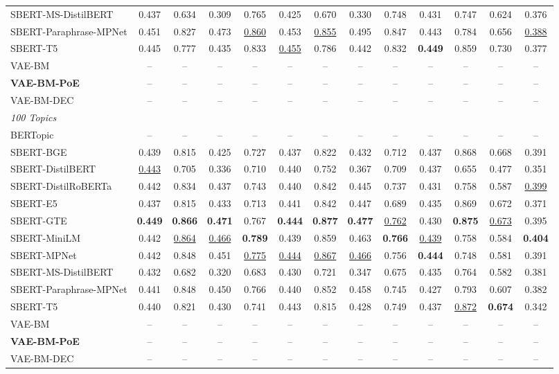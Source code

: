 \begin{table}[t]
{\begin{tabular}{lcccccccccccc}
SBERT-MS-DistilBERT & 0.437 & 0.634 & 0.309 & 0.765 & 0.425 & 0.670 & 0.330 & 0.748 & 0.431 & 0.747 & 0.624 & 0.376 \\
SBERT-Paraphrase-MPNet & 0.451 & 0.827 & 0.473 & \underline{0.860} & 0.453 & \underline{0.855} & 0.495 & 0.847 & 0.443 & 0.784 & 0.656 & \underline{0.388} \\
SBERT-T5 & 0.445 & 0.777 & 0.435 & 0.833 & \underline{0.455} & 0.786 & 0.442 & 0.832 & \textbf{0.449} & 0.859 & 0.730 & 0.377 \\
\midrule
VAE-BM & -- & -- & -- & -- & -- & -- & -- & -- & -- & -- & -- & -- \\
\textbf{VAE-BM-PoE} & -- & -- & -- & -- & -- & -- & -- & -- & -- & -- & -- & -- \\
VAE-BM-DEC & -- & -- & -- & -- & -- & -- & -- & -- & -- & -- & -- & -- \\
\midrule
\multicolumn{13}{l}{\textit{100 Topics}} \\
BERTopic & -- & -- & -- & -- & -- & -- & -- & -- & -- & -- & -- & -- \\
SBERT-BGE & 0.439 & 0.815 & 0.425 & 0.727 & 0.437 & 0.822 & 0.432 & 0.712 & 0.437 & 0.868 & 0.668 & 0.391 \\
SBERT-DistilBERT & \underline{0.443} & 0.705 & 0.336 & 0.710 & 0.440 & 0.752 & 0.367 & 0.709 & 0.437 & 0.655 & 0.477 & 0.351 \\
SBERT-DistilRoBERTa & 0.442 & 0.834 & 0.437 & 0.743 & 0.440 & 0.842 & 0.445 & 0.737 & 0.431 & 0.758 & 0.587 & \underline{0.399} \\
SBERT-E5 & 0.437 & 0.815 & 0.433 & 0.713 & 0.441 & 0.842 & 0.447 & 0.689 & 0.435 & 0.869 & 0.672 & 0.371 \\
SBERT-GTE & \textbf{0.449} & \textbf{0.866} & \textbf{0.471} & 0.767 & \textbf{0.444} & \textbf{0.877} & \textbf{0.477} & \underline{0.762} & 0.430 & \textbf{0.875} & \underline{0.673} & 0.395 \\
SBERT-MiniLM & 0.442 & \underline{0.864} & \underline{0.466} & \textbf{0.789} & 0.439 & 0.859 & 0.463 & \textbf{0.766} & \underline{0.439} & 0.758 & 0.584 & \textbf{0.404} \\
SBERT-MPNet & 0.442 & 0.848 & 0.451 & \underline{0.775} & \underline{0.444} & \underline{0.867} & \underline{0.466} & 0.756 & \textbf{0.444} & 0.748 & 0.581 & 0.391 \\
SBERT-MS-DistilBERT & 0.432 & 0.682 & 0.320 & 0.683 & 0.430 & 0.721 & 0.347 & 0.675 & 0.435 & 0.764 & 0.582 & 0.381 \\
SBERT-Paraphrase-MPNet & 0.441 & 0.848 & 0.450 & 0.766 & 0.440 & 0.852 & 0.458 & 0.745 & 0.427 & 0.793 & 0.607 & 0.382 \\
SBERT-T5 & 0.440 & 0.821 & 0.430 & 0.741 & 0.443 & 0.815 & 0.428 & 0.749 & 0.437 & \underline{0.872} & \textbf{0.674} & 0.342 \\
\midrule
VAE-BM & -- & -- & -- & -- & -- & -- & -- & -- & -- & -- & -- & -- \\
\textbf{VAE-BM-PoE} & -- & -- & -- & -- & -- & -- & -- & -- & -- & -- & -- & -- \\
VAE-BM-DEC & -- & -- & -- & -- & -- & -- & -- & -- & -- & -- & -- & -- \\
\bottomrule
\end{tabular}
}
\end{table}

